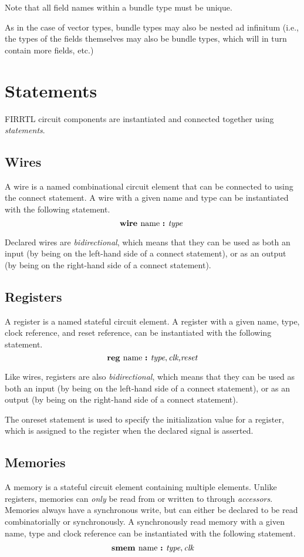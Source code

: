 \documentclass[12pt]{article}
\begin{document}
Note that all field names within a bundle type must be unique.

As in the case of vector types, bundle types may also be nested ad infinitum (i.e., the types of the fields themselves may also be bundle types, which will in turn contain more fields, etc.)

\section{Statements} \label{statements}

FIRRTL circuit components are instantiated and connected together using {\em statements}.

\subsection{Wires}
A wire is a named combinational circuit element that can be connected to using the connect statement.
A wire with a given name and type can be instantiated with the following statement.
\[
\text{\bf wire\ } \text{name } \text{\bf :\ } \text{\em type\ } \\
\]

Declared wires are {\em bidirectional}, which means that they can be used as both an input (by being on the left-hand side of a connect statement), or as an output (by being on the right-hand side of a connect statement).

\subsection{Registers}
A register is a named stateful circuit element.
A register with a given name, type, clock reference, and reset reference, can be instantiated with the following statement.
\[
\text{\bf reg\ } \text{name } \text{\bf :\ } \text{\em type},\text{\em clk,} \text{\em reset} \\
\]

Like wires, registers are also {\em bidirectional}, which means that they can be used as both an input (by being on the left-hand side of a connect statement), or as an output (by being on the right-hand side of a connect statement). 

The onreset statement is used to specify the initialization value for a register, which is assigned to the register when the declared  signal is asserted.

\subsection{Memories}
A memory is a stateful circuit element containing multiple elements.
Unlike registers, memories can {\em only} be read from or written to through {\em accessors}.
Memories always have a synchronous write, but can either be declared to be read combinatorially or synchronously.
A synchronously read memory with a given name, type and clock reference can be instantiated with the following statement.
\[
\begin{aligned}
\text{\bf smem\ } \text{name } \text{\bf :\ } \text{\em type},\text{\em clk} \\
\end{aligned}
\]
\end{document}
